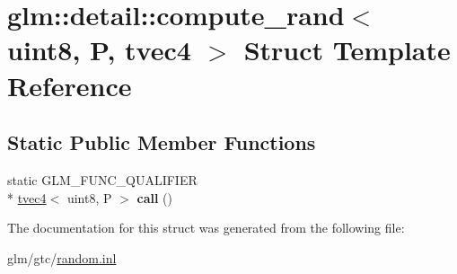 \hypertarget{structglm_1_1detail_1_1compute__rand_3_01uint8_00_01P_00_01tvec4_01_4}{\section{glm\-:\-:detail\-:\-:compute\-\_\-rand$<$ uint8, P, tvec4 $>$ Struct Template Reference}
\label{structglm_1_1detail_1_1compute__rand_3_01uint8_00_01P_00_01tvec4_01_4}
}
\subsection*{Static Public Member Functions}
\begin{DoxyCompactItemize}
\item 
\hypertarget{structglm_1_1detail_1_1compute__rand_3_01uint8_00_01P_00_01tvec4_01_4_ad9fa915c8140a6fa885534d8c60e35fd}{static G\-L\-M\-\_\-\-F\-U\-N\-C\-\_\-\-Q\-U\-A\-L\-I\-F\-I\-E\-R \\*
\hyperlink{structglm_1_1tvec4}{tvec4}$<$ uint8, P $>$ {\bfseries call} ()}\label{structglm_1_1detail_1_1compute__rand_3_01uint8_00_01P_00_01tvec4_01_4_ad9fa915c8140a6fa885534d8c60e35fd}

\end{DoxyCompactItemize}


The documentation for this struct was generated from the following file\-:\begin{DoxyCompactItemize}
\item 
glm/gtc/\hyperlink{random_8inl}{random.\-inl}\end{DoxyCompactItemize}

